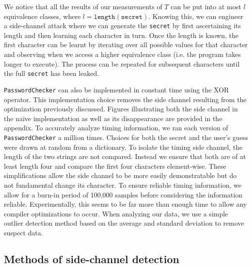 We notice that all the results of our measurements of $T$ can be put into at most $l$ equivalence classes, where $l = \texttt{length}(\texttt{secret})$. Knowing this, we can engineer a side-channel
attack where we can generate the \texttt{secret} by first ascertaining its length and then learning each character in turn. Once the length is known, the first character can be learnt by iterating over all possible values for that character and observing when we access a higher equivalence class (i.e. the program takes longer to execute). The process can be repeated for subsequent characters until the full \texttt{secret} has been leaked.

\texttt{PasswordChecker} can also be implemented in constant time using the XOR operator. This implementation choice removes the side channel resulting from the optimization previously discussed. Figures illustrating both the side channel in the na\"ive implementation as well as its disappearance are provided in the appendix. To accurately analyze timing information, we ran each version of \texttt{PasswordChecker} a million times. Choices for both the secret and the user's guess were drawn at random from a dictionary. To isolate the timing side channel, the length of the two strings are not compared. Instead we ensure that both are of at least length four and compare the first four characters element-wise. These simplifications allow the side channel to be more easily demonstratable but do not fundamental change its character. To ensure reliable timing information, we allow for a burn-in period of 100,000 samples before considering the information reliable. Experimentally, this seems to be far more than enough time to allow any compiler optimizations to occur. When analyzing our data, we use a simple outlier detection method based on the average and standard deviation to remove suspect data.   




\subsection{Methods of side-channel detection}

